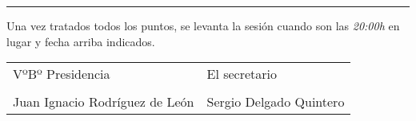 \documentclass[a4paper,12pt]{article}
\begin{document}

\vspace{1cm}
\hrule
\vspace{3mm}

Una vez tratados todos los puntos, se levanta la sesión cuando son las \textit{20:00h} en lugar y fecha arriba indicados.

\vspace{1cm}

\begin{table}[h]
    \begin{tabular}{p{9cm}p{9cm}}
        VºBº Presidencia & El secretario \\
        \vspace{3cm} & \vspace{3cm} \\
        Juan Ignacio Rodríguez de León & Sergio Delgado Quintero \\
    \end{tabular}
\end{table}
\end{document}
